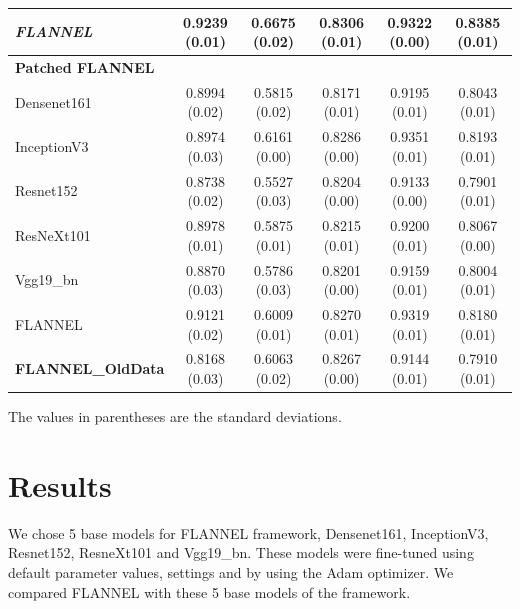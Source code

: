 \documentclass{sigkddExp}
\begin{document}
\begin{table}
\begin{tabular}{ |lccccc| }
        \textit{FLANNEL}          & 0.9239 (0.01) & 0.6675 (0.02)   & 0.8306 (0.01)      &
        0.9322 (0.00)             & 0.8385 (0.01)                                          \\ \hline
        \textbf{Patched FLANNEL}  &               &                 &                    &
                                  &                                                        \\
        Densenet161               & 0.8994 (0.02) & 0.5815 (0.02)   & 0.8171 (0.01)      &
        0.9195 (0.01)             & 0.8043 (0.01)                                          \\
        InceptionV3               & 0.8974 (0.03) & 0.6161 (0.00)   & 0.8286 (0.00)      &
        0.9351 (0.01)             & 0.8193 (0.01)                                          \\
        Resnet152                 & 0.8738 (0.02) & 0.5527 (0.03)   & 0.8204 (0.00)      &
        0.9133 (0.00)             & 0.7901 (0.01)                                          \\
        ResNeXt101                & 0.8978 (0.01) & 0.5875 (0.01)   & 0.8215 (0.01)      &
        0.9200 (0.01)             & 0.8067 (0.00)                                          \\
        Vgg19\_bn                 & 0.8870 (0.03) & 0.5786 (0.03)   & 0.8201 (0.00)      &
        0.9159 (0.01)             & 0.8004 (0.01)                                          \\

        FLANNEL                   & 0.9121 (0.02) & 0.6009 (0.01)   & 0.8270 (0.01)      &
        0.9319 (0.01)             & 0.8180 (0.01)                                          \\ \hline
        \textbf{FLANNEL\_OldData} & 0.8168 (0.03) & 0.6063 (0.02)   & 0.8267 (0.00)      &
        0.9144 (0.01)             & 0.7910 (0.01)                                          \\ \hline
    \end{tabular}\par
    \bigskip
    The values in parentheses are the standard deviations.
\end{table}

\section{Results}

We chose 5 base models for FLANNEL framework, Densenet161, InceptionV3,
Resnet152, ResneXt101 and Vgg19\_bn. These models were fine-tuned using default
parameter values, settings and by using the Adam optimizer. We compared FLANNEL
with these 5 base models of the framework.
\end{document}
